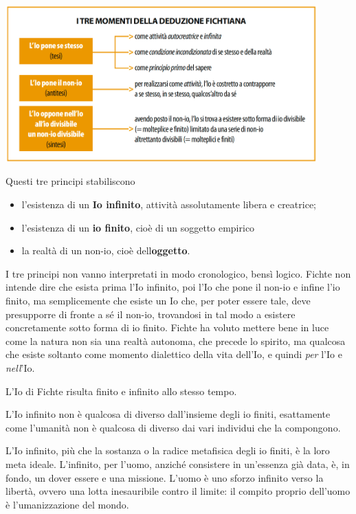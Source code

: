 \documentclass[a4paper, twoside, titlepage]{book}
\begin{document}
\begin{center}
\includegraphics[width=12cm]{2}
\end{center}

Questi tre principi stabiliscono
\begin{itemize}
\item l'esistenza di un \textbf{Io infinito}, attività assolutamente libera e creatrice;
\item l'esistenza di un \textbf{io finito}, cioè di un soggetto empirico
\item la realtà di un non-io, cioè dell\textbf{oggetto}.
\end{itemize}

I tre principi non vanno interpretati in modo cronologico, bensì logico. Fichte non intende dire che esista prima l'Io infinito, poi l'Io che pone il non-io e infine l'io finito, ma semplicemente che esiste un Io che, per poter essere tale, deve presupporre di fronte a sé il non-io, trovandosi in tal modo a esistere concretamente sotto forma di io finito.
Fichte ha voluto mettere bene in luce come la natura non sia una realtà autonoma, che precede lo spirito, ma qualcosa che esiste soltanto come momento dialettico della vita dell'Io, e quindi \textit{per} l'Io e \textit{nell}'Io.

L'Io di Fichte risulta finito e infinito allo stesso tempo.

L'Io infinito non è qualcosa di diverso dall'insieme degli io finiti, esattamente come l'umanità non è qualcosa di diverso dai vari individui che la compongono.

L'Io infinito, più che la sostanza o la radice metafisica degli io finiti, è la loro meta ideale. L'infinito, per l'uomo, anziché consistere in un'essenza già data, è, in fondo, un dover essere e una missione. L'uomo è uno sforzo infinito verso la libertà, ovvero una lotta inesauribile contro il limite: il compito proprio dell'uomo è l'umanizzazione del mondo.
\end{document}
